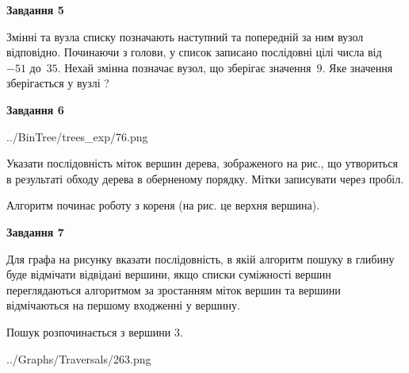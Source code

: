 \documentclass[12pt, ukrainian]{article}
\begin{document}
{\begin {large}
{\begin {center}\textbf{Завдання 5}\end {center}}\par
Змінні  та  вузла списку позначають наступний та попередній за ним вузол відповідно. Починаючи з голови, у список записано послідовні цілі числа від~$-51$ до~$35$. Нехай змінна  позначає вузол, що зберігає значення~$9$.
Яке значення зберігається у вузлі  ?\par
\newpage

{\begin {center}\textbf{Завдання 6}\end {center}}\par

\begin{center}
	{../BinTree/trees_exp/76.png}
\end{center}
Указати послідовність міток вершин дерева, зображеного на рис., що утвориться в результаті обходу дерева в оберненому порядку. Мітки записувати через пробіл.\par Алгоритм починає роботу з кореня (на рис. це верхня вершина).\par
\newpage

{\begin {center}\textbf{Завдання 7}\end {center}}\par
Для графа на рисунку вказати послідовність, в якій алгоритм пошуку в глибину буде відмічати відвідані вершини, якщо списки суміжності вершин переглядаються алгоритмом за зростанням міток вершин та вершини відмічаються на першому вход\-женні у вершину.\par
Пошук розпочинається з вершини 3.\par

\begin{center}
	{../Graphs/Traversals/263.png}
\end{center}\par
\newpage


\end{large}}
\end{document}
